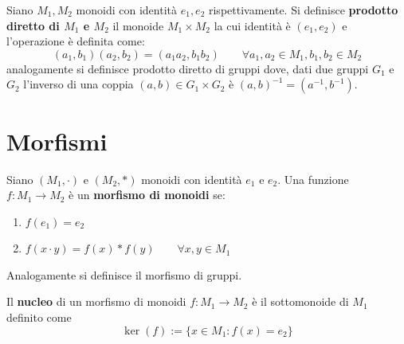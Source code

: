 \documentclass[../main.tex]{subfiles}
\begin{document}
\begin{definition}
    Siano $M_1 , M_2$ monoidi con identità $e_1 , e_2$ rispettivamente. Si definisce \textbf{prodotto diretto di $M_1$ e $M_2$} il monoide $M_1 \times M_2$ la cui identità è $(e_1,e_2)$ e l'operazione è definita come:
    \[
        (a_1,b_1)(a_2,b_2) = (a_1 a_2, b_1 b_2) \qquad \forall a_1, a_2 \in M_1, b_1, b_2 \in M_2
    \]
    analogamente si definisce prodotto diretto di gruppi dove, dati due gruppi $G_1$ e $G_2$ l'inverso di una coppia $(a,b) \in G_1 \times G_2$ è $(a,b)^{-1} = (a^{-1},b^{-1})$.
\end{definition}

\section{Morfismi}
\begin{definition}
    Siano $(M_1, \cdot)$ e $(M_2, \ast)$ monoidi con identità $e_1$ e $e_2$. Una funzione $f : M_1 \rightarrow M_2$ è un \textbf{morfismo di monoidi} se:
    \begin{enumerate}[label=(\roman*)]
        \item $f(e_1) = e_2$
        \item $f(x\cdot y) = f(x) \ast f(y) \qquad \forall x,y \in M_1$
    \end{enumerate}
    Analogamente si definisce il morfismo di gruppi.
\end{definition}

\begin{definition}[Nucleo]
    Il \textbf{nucleo} di un morfismo di monoidi $f: M_1 \rightarrow M_2$ è il sottomonoide di $M_1$ definito come
    \[
        \boxed{
            \ker(f):= \{x \in M_1 : f(x) = e_2\}
        }
    \]
\end{definition}
\end{document}
